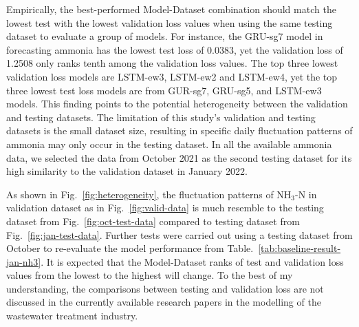 Empirically, the best-performed Model-Dataset combination should match the lowest test with the lowest validation loss values when using the same testing dataset to evaluate a group of models. For instance, the GRU-sg7 model in forecasting ammonia has the lowest test loss of 0.0383, yet the validation loss of 1.2508 only ranks tenth among the validation loss values. The top three lowest validation loss models are LSTM-ew3, LSTM-ew2 and LSTM-ew4, yet the top three lowest test loss models are from GUR-sg7, GRU-sg5, and LSTM-ew3 models. This finding points to the potential heterogeneity between the validation and testing datasets. The limitation of this study's validation and testing datasets is the small dataset size, resulting in specific daily fluctuation patterns of ammonia may only occur in the testing dataset. In all the available ammonia data, we selected the data from October 2021 as the second testing dataset for its high similarity to the validation dataset in January 2022.

As shown in Fig.~\ref{fig:heterogeneity}, the fluctuation patterns of NH$_{3}$-N in validation dataset as in Fig.~\ref{fig:valid-data} is much resemble to the testing dataset from Fig.~\ref{fig:oct-test-data} compared to testing dataset from Fig.~\ref{fig:jan-test-data}. Further tests were carried out using a testing dataset from October to re-evaluate the model performance from Table.~\ref{tab:baseline-result-jan-nh3}. It is expected that the Model-Dataset ranks of test and validation loss values from the lowest to the highest will change. To the best of my understanding, the comparisons between testing and validation loss are not discussed in the currently available research papers in the modelling of the wastewater treatment industry.

